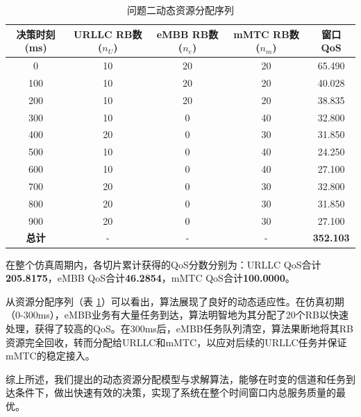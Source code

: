 \begin{table}[H]
\centering
\caption{问题二动态资源分配序列}
\label{tab:q2_decision_sequence}
\begin{tabular}{ccccc}
\hline
\textbf{决策时刻 (ms)} & \textbf{URLLC RB数 ($n_U$)} & \textbf{eMBB RB数 ($n_e$)} & \textbf{mMTC RB数 ($n_m$)} & \textbf{窗口QoS} \\
\hline
0 & 10 & 20 & 20 & 65.490 \\
100 & 10 & 20 & 20 & 40.028 \\
200 & 10 & 20 & 20 & 38.835 \\
300 & 10 & 0 & 40 & 32.800 \\
400 & 20 & 0 & 30 & 31.850 \\
500 & 10 & 0 & 40 & 24.250 \\
600 & 10 & 0 & 40 & 27.100 \\
700 & 20 & 0 & 30 & 32.800 \\
800 & 20 & 0 & 30 & 31.850 \\
900 & 20 & 0 & 30 & 27.100 \\
\hline
\textbf{总计} & - & - & - & \textbf{352.103} \\
\hline
\end{tabular}
\end{table}

在整个仿真周期内，各切片累计获得的QoS分数分别为：URLLC QoS合计\textbf{205.8175}，eMBB QoS合计\textbf{46.2854}，mMTC QoS合计\textbf{100.0000}。


从资源分配序列（表 \ref{tab:q2_decision_sequence}）可以看出，算法展现了良好的动态适应性。在仿真初期（0-300ms），eMBB业务有大量任务到达，算法明智地为其分配了20个RB以快速处理，获得了较高的QoS。在300ms后，eMBB任务队列清空，算法果断地将其RB资源完全回收，转而分配给URLLC和mMTC，以应对后续的URLLC任务并保证mMTC的稳定接入。

综上所述，我们提出的动态资源分配模型与求解算法，能够在时变的信道和任务到达条件下，做出快速有效的决策，实现了系统在整个时间窗口内总服务质量的最优。